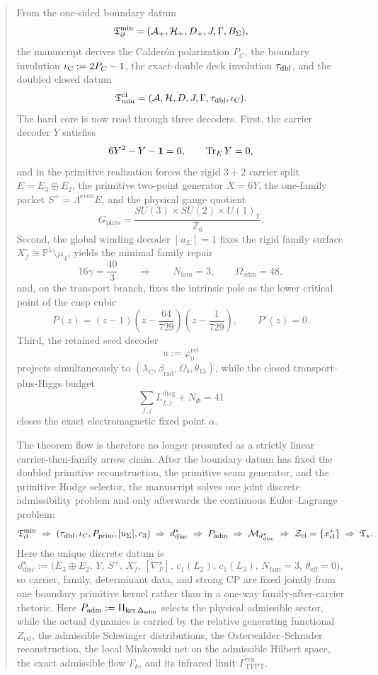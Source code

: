 
\maketitle

\begin{abstract}
From the one-sided boundary datum
\[
\Tbound=(\mathcal A_+,\mathcal H_+,D_+,J,\Gamma,B_\Sigma),
\]
the manuscript derives the Calder\'on polarization $P_C$, the boundary involution
$\iC:=2P_C-1$, the exact-double deck involution $\taudbl$, and the doubled closed datum
\[
\Tmin^{\mathrm{cl}}=(\mathcal A,\mathcal H,D,J,\Gamma,\taudbl,\iC).
\]
The hard core is now read through three decoders. First, the carrier decoder $Y$ satisfies
\[
6Y^2-Y-\mathbf 1=0,
\qquad
\tr_EY=0,
\]
and in the primitive realization forces the rigid $3+2$ carrier split
$E=E_3\oplus E_2$, the primitive two-point generator $X=6Y$, the one-family packet
$S^+=\Lambda^{\mathrm{even}}E$, and the physical gauge quotient
\[
G_{\mathrm{phys}}
=
\frac{SU(3)\times SU(2)\times U(1)_Y}{\mathbb Z_6}.
\]
Second, the global winding decoder $[u_\Sigma]=1$ fixes the rigid family surface
$X_f^\circ\cong \mathbb P^1\setminus\mu_4$, yields the minimal family repair
\[
16\gamma=\frac{40}{3}
\qquad\Longrightarrow\qquad
N_{\mathrm{fam}}=3,
\qquad
\Omega_{\mathrm{adm}}=48,
\]
and, on the transport branch, fixes the intrinsic pole as the lower critical point of the cusp cubic
\[
P(z)=(z-1)\left(z-\frac{64}{729}\right)\left(z-\frac{1}{729}\right),
\qquad
P'(z)=0.
\]
Third, the retained seed decoder
\[
u:=\varphi_0^{\mathrm{ret}}
\]
projects simultaneously to $(\lambda_C,\beta_{\mathrm{rad}},\Omega_b,\theta_{13})$, while the
closed transport-plus-Higgs budget
\[
\sum_{f,j}L_{f,j}^{\mathrm{diag}}+N_\Phi=41
\]
closes the exact electromagnetic fixed point $\alpha$.

The theorem flow is therefore no longer presented as a strictly linear carrier-then-family arrow
chain. After the boundary datum has fixed the doubled primitive reconstruction, the primitive seam
generator, and the primitive Hodge selector, the manuscript solves one joint discrete admissibility
problem and only afterwards the continuous Euler--Lagrange problem:
\[
\Tbound
\;\Rightarrow\;
(\taudbl,\iC,\Pprim,[u_\Sigma],\cthree)
\;\Rightarrow\;
d^\star_{\mathrm{disc}}
\;\Rightarrow\;
\Padm
\;\Rightarrow\;
\mathcal M_{d^\star_{\mathrm{disc}}}
\;\Rightarrow\;
\mathcal Z_{\mathrm{cl}}=\{x^\star_{\mathrm{cl}}\}
\;\Rightarrow\;
\Tstar.
\]
Here the unique discrete datum is
\[
d^\star_{\mathrm{disc}}
:=
\bigl(
E_3\oplus E_2,\,
Y,\,
S^+,\,
X_f^\circ,\,
[\nabla_F^\star],\,
c_1(L_2),\,
c_1(L_3),\,
N_{\mathrm{fam}}=3,\,
\theta_{\mathrm{eff}}=0
\bigr),
\]
so carrier, family, determinant data, and strong CP are fixed jointly from one boundary primitive
kernel rather than in a one-way family-after-carrier rhetoric. Here $\Padm:=\Pi_{\ker
\Delta_{\mathrm{adm}}}$ selects the physical admissible sector, while the actual dynamics is
carried by the relative generating functional $Z_{\mathrm{rel}}$, the admissible Schwinger
distributions, the Osterwalder--Schrader reconstruction, the local Minkowski net on the admissible
Hilbert space, the exact admissible flow $\Gamma_k$, and its infrared limit
$\Gamma_{\mathrm{TFPT}}^{\mathrm{ren}}$.


\end{abstract}
